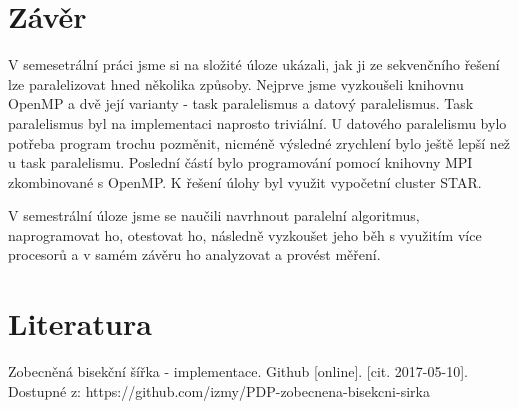 \documentclass[a4paper, 12pt]{article}
\begin{document}
\newpage
\section{Závěr}

V semesetrální práci jsme si na složité úloze ukázali, jak ji ze sekvenčního řešení lze paralelizovat hned několika způsoby. Nejprve jsme vyzkoušeli knihovnu OpenMP a dvě její varianty - task paralelismus a datový paralelismus. Task paralelismus byl na implementaci naprosto triviální. U datového paralelismu bylo potřeba program trochu pozměnit, nicméně výsledné zrychlení bylo ještě lepší než u task paralelismu. Poslední částí bylo programování pomocí knihovny MPI zkombinované s OpenMP. K řešení úlohy byl využit vypočetní cluster STAR. 

V semestrální úloze jsme se naučili navrhnout paralelní algoritmus, naprogramovat ho, otestovat ho, následně vyzkoušet jeho běh s využitím více procesorů a v samém závěru ho analyzovat a provést měření.


\section{Literatura}

Zobecněná bisekční šířka - implementace. Github [online]. [cit. 2017-05-10].
\\ Dostupné z: https://github.com/izmy/PDP-zobecnena-bisekcni-sirka

\appendix
\end{document}
